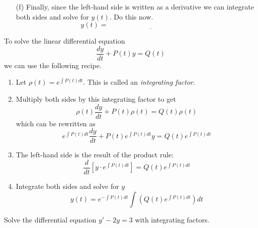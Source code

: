 \begin{problem}
\begin{enumerate}
        \solution{
            \[ \frac{d}{dt}\left[ e^{t^2} y \right] = 5te^{t^2} \]
            }
    \item[(f)] Finally, since the left-hand side is written as a derivative we can
        integrate both sides and solve for $y(t)$.  Do this now.
        \[ y(t) = \underline{\hspace{2in}} \]
        \solution{
            \[ e^{t^2} y = 5\int te^{t^2} dt \implies e^{t^2} y = \frac{5}{2} \int e^u du
            = \frac{5}{2} e^{t^2} + C \]
            \[ \implies y(t) = \frac{5}{2} + Ce^{-t^2} \quad \text{and} \quad y(0) = 1
            \implies y(t) = \frac{5}{2} - \frac{3}{2} e^{-t^2}\]
        }
    \end{enumerate}
\end{problem}



\begin{technique}
    To solve the linear differential equation
    \[ \frac{dy}{dt} + P(t) y = Q(t) \]
    we can use the following recipe.  
    \begin{enumerate}
        \item Let $\rho(t) = e^{\int P(t) dt}$.  This is called an {\it integrating factor}.
        \item Multiply both sides by this integrating factor to get
            \[ \rho(t) \frac{dy}{dt} + P(t) \rho(t) = Q(t) \rho(t) \]
            which can be rewritten as
            \[ e^{\int P(t) dt} \frac{dy}{dt} + P(t) e^{\int P(t) dt} y = Q(t) e^{\int P(t)
            dt} \]
        \item The left-hand side is the result of the product rule:
            \[ \frac{d}{dt} \left[ y \cdot e^{\int P(t) dt} \right] = Q(t) e^{\int P(t) dt} \]
        \item Integrate both sides and solve for $y$
            \[ y(t) = e^{-\int P(t) dt} \int \left( Q(t) e^{\int P(t) dt} \right) dt \]
    \end{enumerate}
\end{technique}

\begin{problem}
    Solve the differential equation $y' -2 y = 3$ with integrating factors.
\end{problem}

